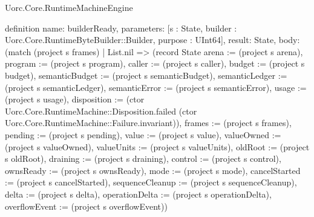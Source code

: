 \begin{lexlean}{Uorc.Core.RuntimeMachineEngine}
\begin{semanticmodule}
definition{
  name: builderReady,
  parameters: [s : State, builder : Uorc.Core.RuntimeByteBuilder::Builder, purpose : UInt64],
  result: State,
  body: (match (project s frames)
    | List.nil => (record State {arena := (project s arena), program := (project s program), caller := (project s caller), budget := (project s budget), semanticBudget := (project s semanticBudget), semanticLedger := (project s semanticLedger), semanticError := (project s semanticError), usage := (project s usage), disposition := (ctor Uorc.Core.RuntimeMachine::Disposition.failed (ctor Uorc.Core.RuntimeMachine::Failure.invariant)), frames := (project s frames), pending := (project s pending), value := (project s value), valueOwned := (project s valueOwned), valueUnits := (project s valueUnits), oldRoot := (project s oldRoot), draining := (project s draining), control := (project s control), ownsReady := (project s ownsReady), mode := (project s mode), cancelStarted := (project s cancelStarted), sequenceCleanup := (project s sequenceCleanup), delta := (project s delta), operationDelta := (project s operationDelta), overflowEvent := (project s overflowEvent)})
}
\end{semanticmodule}
\end{lexlean}
